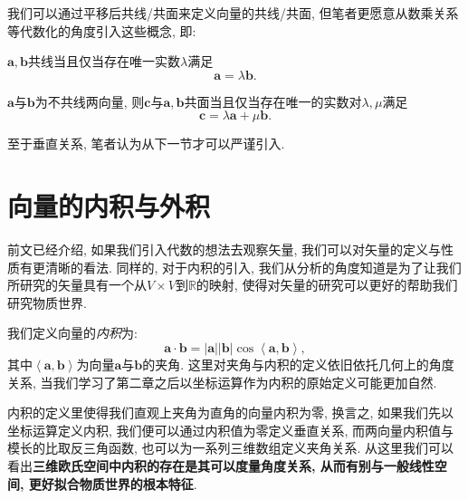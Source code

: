 \documentclass[./main.tex]{subfiles}
\begin{document}
我们可以通过平移后共线/共面来定义向量的共线/共面, 但笔者更愿意从数乘关系等代数化的角度引入这些概念, 即: 
\begin{theorem}[共线定理]
    \(\mathbf{a}, \mathbf{b} \)共线当且仅当存在唯一实数\(\lambda\)满足
\[\mathbf{a} =\lambda \mathbf{b}.\]
\end{theorem}
\begin{theorem}[共面定理]
\(\mathbf{a}\)与\(\mathbf{b}\)为不共线两向量, 则\(\mathbf{c}\)与\(\mathbf{a}, \mathbf{b}\)共面当且仅当存在唯一的实数对\(\lambda ,\mu\)满足
\[\mathbf{c}=\lambda \mathbf{a} +\mu \mathbf{b}.\]
\end{theorem}
至于垂直关系, 笔者认为从下一节才可以严谨引入. 
\section{向量的内积与外积}
前文已经介绍, 如果我们引入代数的想法去观察矢量, 我们可以对矢量的定义与性质有更清晰的看法. 同样的, 对于内积的引入, 我们从分析的角度知道是为了让我们所研究的矢量具有一个从\(V\times V\)到\(\mathbb{R}\)的映射, 使得对矢量的研究可以更好的帮助我们研究物质世界. 

我们定义向量的\textit{内积}为:
\[\mathbf{a}\cdot\mathbf{b}=\left |\mathbf{a} \right | \left | \mathbf{b} \right | \cos  \left \langle \mathbf{a},\mathbf{b} \right \rangle,\]
其中\(\left \langle\mathbf{a},\mathbf{b} \right \rangle\)为向量\(\mathbf{a}\)与\(\mathbf{b}\)的夹角. 这里对夹角与内积的定义依旧依托几何上的角度关系, 当我们学习了第二章之后以坐标运算作为内积的原始定义可能更加自然. 

内积的定义里使得我们直观上夹角为直角的向量内积为零, 换言之, 如果我们先以坐标运算定义内积, 我们便可以通过内积值为零定义垂直关系, 而两向量内积值与模长的比取反三角函数, 也可以为一系列三维数组定义夹角关系. 从这里我们可以看出\textbf{三维欧氏空间中内积的存在是其可以度量角度关系, 从而有别与一般线性空间, 更好拟合物质世界的根本特征}.
\end{document}
